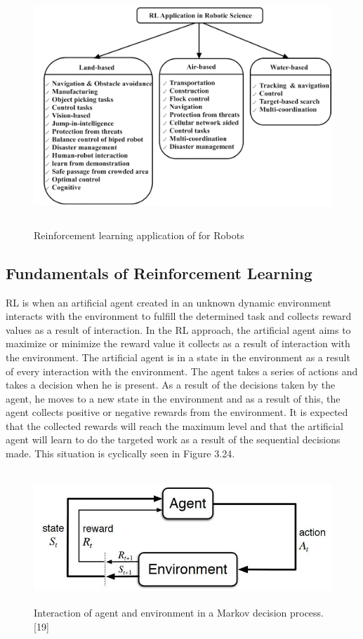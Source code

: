 \documentclass[12pt,twoside,a4]{mwbk}
\begin{document}
\begin{figure}[h]
    \centering
    \includegraphics[width=14cm, height=9.0cm]{robots2.png}
    \caption{Reinforcement learning application of for Robots}
\end{figure}

\subsection{Fundamentals of Reinforcement Learning}
RL is when an artificial agent created in an unknown dynamic environment interacts with the environment to fulfill the determined task and collects reward values as a result of interaction. In the RL approach, the artificial agent aims to maximize or minimize the reward value it collects as a result of interaction with the environment. The artificial agent is in a state in the environment as a result of every interaction with the environment. The agent takes a series of actions and takes a decision when he is present. As a result of the decisions taken by the agent, he moves to a new state in the environment and as a result of this, the agent collects positive or negative rewards from the environment. It is expected that the collected rewards will reach the maximum level and that the artificial agent will learn to do the targeted work as a result of the sequential decisions made. This situation is cyclically seen in Figure 3.24.
\begin{figure}[h]
    \centering
    \includegraphics[width=14.0cm, height=5.0cm]{agent_rl.JPG}
    \caption{Interaction of agent and environment in a Markov decision process. [19]}
\end{figure}
\end{document}
